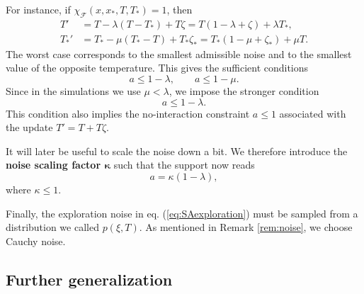 \documentclass[10pt,a4paper]{article}
\theoremstyle{theorem}
\numberwithin{equation}{section}
\begin{document}
For instance, if \(\chi_\mathcal F(x,x_*,T,T_*)=1\), then
\begin{equation}
\begin{split}
T' &= T-\lambda(T-T_*)+T\zeta
    =T(1-\lambda+\zeta)+\lambda T_*,\\
T_*' &= T_*-\mu(T_*-T)+T_*\zeta_*
    =T_*(1-\mu+\zeta_*)+\mu T.
\end{split}
\end{equation}
The worst case corresponds to the smallest admissible noise and to the smallest
value of the opposite temperature. This gives the sufficient conditions
\[
a\le 1-\lambda,
\qquad
a\le 1-\mu.
\]
Since in the simulations we use \(\mu<\lambda\), we impose the stronger condition
\begin{equation}
\label{eq:bound}
a\le 1-\lambda.
\end{equation}
This condition also implies the no-interaction constraint \(a\le1\) associated
with the update \(T'=T+T\zeta\).

It will later be useful to scale the noise down a bit. We therefore introduce the \textbf{noise scaling factor $\bm{\kappa}$} such that the support now reads
\begin{equation}
\label{eq:noise_scaled}
a = \kappa(1-\lambda),
\end{equation}
where $\kappa\leq1$.

Finally, the exploration noise in eq. (\ref{eq:SAexploration}) must be sampled from a distribution we called $p(\xi,T)$. As mentioned in Remark \ref{rem:noise}, we choose Cauchy noise. 

\subsection{Further generalization}
\end{document}

